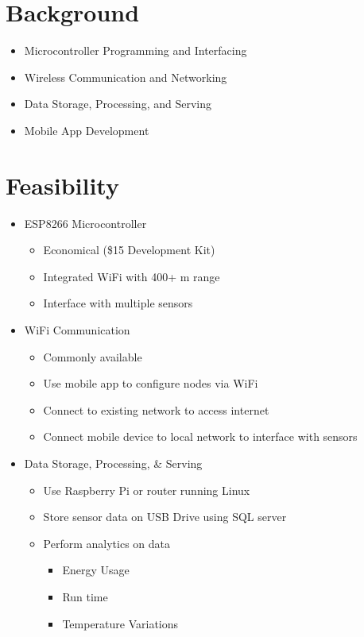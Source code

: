 	\section{Background}
		\begin{itemize}
			\item Microcontroller Programming and Interfacing
			\item Wireless Communication and Networking
			\item Data Storage, Processing, and Serving
			\item Mobile App Development
		\end{itemize}
 
	 \section{Feasibility}
		 \begin{itemize}
		 	\item ESP8266 Microcontroller
			 	\begin{itemize}
			 		\item Economical (\$15 Development Kit)
			 		\item Integrated WiFi with 400+ m range
			 		\item Interface with multiple sensors
			 	\end{itemize}
		 	\item WiFi Communication
			 	\begin{itemize}
			 		\item Commonly available
			 		\item Use mobile app to configure nodes via WiFi
			 		\item Connect to existing network to access internet
			 		\item Connect mobile device to local network to interface with sensors
			 	\end{itemize}
		 	\item Data Storage, Processing, \& Serving
			 	\begin{itemize}
			 		\item Use Raspberry Pi or router running Linux
			 		\item Store sensor data on USB Drive using SQL server
			 		\item Perform analytics on data
			 		\begin{itemize}
				 		\item Energy Usage
				 		\item Run time
				 		\item Temperature Variations

\end{itemize}
\end{itemize}
\end{itemize}
